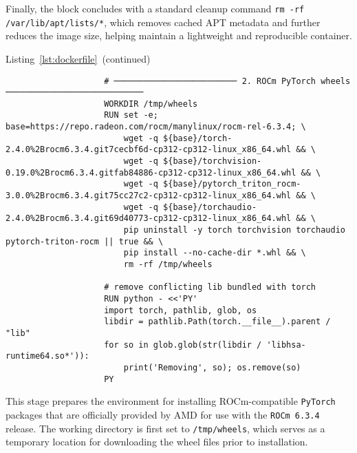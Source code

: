 Finally, the block concludes with a standard cleanup command \texttt{rm -rf /var/lib/apt/lists/*}, which removes cached APT metadata and further reduces the image size, helping maintain a lightweight and reproducible container.

\vspace{1em}

\begin{minipage}{\textwidth}
	\captionsetup{type=listing}
	\caption*{Listing~\ref{lst:dockerfile}~(continued)}

	\begin{verbatim}
                    # ───────────────────────── 2. ROCm PyTorch wheels ────────────────────────────
                    WORKDIR /tmp/wheels
                    RUN set -e; base=https://repo.radeon.com/rocm/manylinux/rocm-rel-6.3.4; \
                        wget -q ${base}/torch-2.4.0%2Brocm6.3.4.git7cecbf6d-cp312-cp312-linux_x86_64.whl && \
                        wget -q ${base}/torchvision-0.19.0%2Brocm6.3.4.gitfab84886-cp312-cp312-linux_x86_64.whl && \
                        wget -q ${base}/pytorch_triton_rocm-3.0.0%2Brocm6.3.4.git75cc27c2-cp312-cp312-linux_x86_64.whl && \
                        wget -q ${base}/torchaudio-2.4.0%2Brocm6.3.4.git69d40773-cp312-cp312-linux_x86_64.whl && \
                        pip uninstall -y torch torchvision torchaudio pytorch-triton-rocm || true && \
                        pip install --no-cache-dir *.whl && \
                        rm -rf /tmp/wheels

                    # remove conflicting lib bundled with torch
                    RUN python - <<'PY'
                    import torch, pathlib, glob, os
                    libdir = pathlib.Path(torch.__file__).parent / "lib"
                    for so in glob.glob(str(libdir / 'libhsa-runtime64.so*')):
                        print('Removing', so); os.remove(so)
                    PY

    \end{verbatim}
\end{minipage}

This stage prepares the environment for installing ROCm-compatible \texttt{PyTorch} packages that are officially provided by AMD for use with the \texttt{ROCm 6.3.4} release. The working directory is first set to \texttt{/tmp/wheels}, which serves as a temporary location for downloading the wheel files prior to installation.

